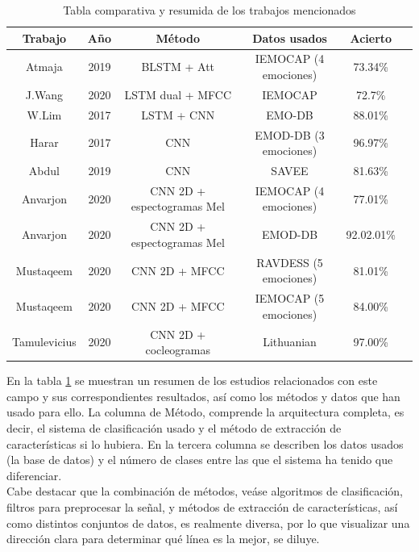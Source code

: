 \documentclass[11pt,a4paper,spanish]{book}
\begin{document}
	\begin{table}[H]
		\centering
		\begin{center}
			\begin{tabular}{| c | c | c | c| c | c|}
				\hline
					Trabajo & Año & Método &  Datos usados  & Acierto \\ 
				\hline
					Atmaja & 2019 &   BLSTM + Att  & IEMOCAP (4 emociones) & 73.34\% 	\\
					J.Wang & 2020 & LSTM dual + MFCC & IEMOCAP & 72.7\% \\
					W.Lim & 2017 &   LSTM + CNN & EMO-DB &  88.01\%		\\ 
					Harar & 2017 &  CNN & EMOD-DB (3 emociones) &  96.97\%			\\
					Abdul & 2019 & CNN & SAVEE & 81.63\%				\\
					Anvarjon & 2020 & CNN 2D + espectogramas Mel & IEMOCAP (4 emociones) & 77.01\%\\
					Anvarjon & 2020 & CNN 2D + espectogramas Mel & EMOD-DB & 92.02.01\%\\
					Mustaqeem & 2020 & CNN 2D + MFCC & RAVDESS (5 emociones) & 81.01\% \\
					Mustaqeem & 2020 & CNN 2D + MFCC & IEMOCAP (5 emociones) & 84.00\% \\  
					Tamulevicius & 2020 & CNN 2D + cocleogramas & Lithuanian & 97.00\% \\
				\hline	
			\end{tabular}
		
			\caption{Tabla comparativa y resumida de los trabajos mencionados}
			\label{tab:metod_comp}
		\end{center}
	\end{table}

	En la tabla \ref{tab:metod_comp} se muestran un resumen de los estudios relacionados con este campo y sus correspondientes resultados, así como los métodos y datos que han usado para ello. La columna de Método, comprende la arquitectura completa, es decir, el sistema de clasificación usado y el método de extracción de características si lo hubiera. En la tercera columna se describen los datos usados (la base de datos) y el número de clases entre las que el sistema ha tenido que diferenciar.\\
	
	Cabe destacar que la combinación de métodos, veáse algoritmos de clasificación, filtros para preprocesar la señal, y métodos de extracción de características, así como distintos conjuntos de datos, es realmente diversa, por lo que visualizar una dirección clara para determinar qué línea es la mejor, se diluye. 
	
\end{document}
